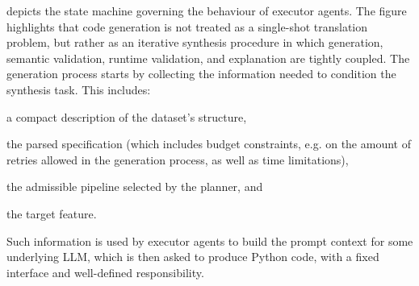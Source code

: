 \documentclass[runningheads]{llncs}
\newenvironment{inlinelist}{\begin{enumerate*}[label=\emph{(\roman*)}]}{\end{enumerate*}}
\begin{document}
 depicts the state machine governing the behaviour of executor agents.
%
The figure highlights that code generation is not treated as a single-shot translation problem,
but rather as an iterative synthesis procedure in which generation,
semantic validation,
runtime validation,
and explanation are tightly coupled.
% 
The generation process starts by collecting the information needed to condition the synthesis task.
%
This includes:
\begin{inlinelist}
  \item a compact description of the dataset's structure,
  \item the parsed specification
  (which includes budget constraints,
  e.g. on the amount of retries allowed in the generation process,
  as well as time limitations),
  \item the admissible pipeline selected by the planner,
  and
  \item the target feature.
\end{inlinelist}
%
Such information is used by executor agents to build the prompt context for some underlying \ac{LLM},
which is then asked to produce Python code,
with a fixed interface and well-defined responsibility.
%
%
\end{document}
